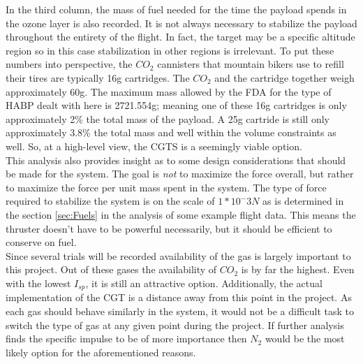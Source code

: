 In the third column, the mass of fuel needed for the time the payload spends in the ozone layer is also recorded. It is not always necessary to stabilize the payload throughout the entirety of the flight. In fact, the target may be a specific altitude region so in this case stabilization in other regions is irrelevant. To put these numbers into perspective, the $CO_2$ cannisters that mountain bikers use to refill their tires are typically 16g cartridges. The $CO_2$ and the cartridge together weigh approximately 60g. The maximum mass allowed by the FDA for the type of HABP dealt with here is 2721.554g; meaning one of these 16g cartridges is only approximately 2\% the total mass of the payload. A 25g cartride is still only approximately 3.8\% the total mass and well within the volume constraints as well. So, at a high-level view, the CGTS is a seemingly viable option.\\
This analysis also provides insight as to some design considerations that should be made for the system. The goal is \textit{not} to maximize the force overall, but rather to maximize the force per unit mass spent in the system. The type of force required to stabilize the system is on the scale of $1*10^-3N$ as is determined in the section \ref{sec:Fuels} in the analysis of some example flight data. This means the thruster doesn't have to be powerful necessarily, but it should be efficient to conserve on fuel.\\
Since several trials will be recorded availability of the gas is largely important to this project. Out of these gases the availability of $CO_2$ is by far the highest. Even with the lowest $I_{sp}$, it is still an attractive option. Additionally, the actual implementation of the CGT is a distance away from this point in the project. As each gas should behave similarly in the system, it would not be a difficult task to switch the type of gas at any given point during the project. If further analysis finds the specific impulse to be of more importance then $N_2$ would be the most likely option for the aforementioned reasons. 
